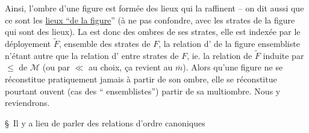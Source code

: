 Ainsi, l'ombre d'une figure est formée des lieux qui la raffinent -- on dit aussi que ce sont les \uline{lieux ``de la figure}'' (à ne pas confondre, avec les strates de la figure qui sont des lieux). La  est donc  des ombres de ses strates, elle est indexée par le déployement $\widetilde F$, ensemble des strates de $F$, la relation d' de la figure ensembliste n'étant autre que la relation d' entre strates de $F$, ie. la relation de $\widetilde F$ induite par $\leq$ de $\mathcal M$ (ou par $\ll$ au choix, ça revient au $\overline m$). Alors qu'une figure ne se réconstitue pratiquement jamais à partir de son ombre, elle se réconstitue pourtant ouvent (cas des `` ensemblistes'')  partir de sa multiombre. Nous y reviendrons.

\S\ Il y a lieu de parler des relations d'ordre canoniques
